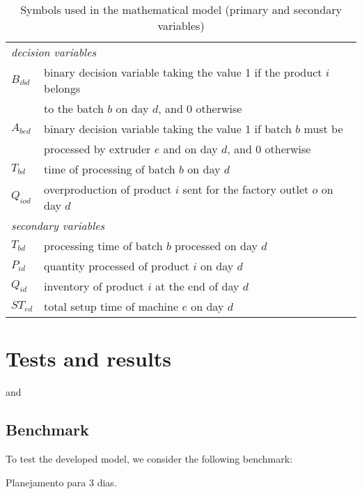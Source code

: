 \begin{table}[h!]
\begin{center}
\footnotesize
	\begin{tabular}{ l l } 

		\multicolumn{2}{l}{\emph{decision variables}} \\ 
		
		$B_{ibd}$ & binary decision variable taking the value 1 if the product $i$ belongs \\
		& to the batch $b$ on day $d$, and 0 otherwise \\
		$A_{bed}$ &  binary decision variable taking the value 1 if batch $b$ must be \\
		&            processed by extruder $e$ and on day $d$, and 0 otherwise \\
       	$T_{bd}$ & time of processing of batch $b$ on day $d$ \\
       	$Q_{iod}$ & overproduction of product $i$ sent for the factory outlet $o$ on day $d$ \\
       	
       	\multicolumn{2}{l}{\emph{secondary variables}} \\ 
       	
		$T_{bd}$ & processing time of batch $b$ processed on day $d$ \\
		$P_{id}$ & quantity processed of product $i$ on day $d$ \\
		$Q_{id}$ & inventory of product $i$ at the end of day $d$ \\ 
		$ST_{ed}$ & total setup time of machine $e$ on day $d$
	\end{tabular}
\caption{Symbols used in the mathematical model (primary and secondary variables)}
\label{tab:symbols}
\end{center}
\end{table}

\section{Tests and results}

and \cite{RefJ}
\subsection{Benchmark}
\label{sec:2}

To test the developed model, we consider the following benchmark:

Planejamento para 3 dias. 

